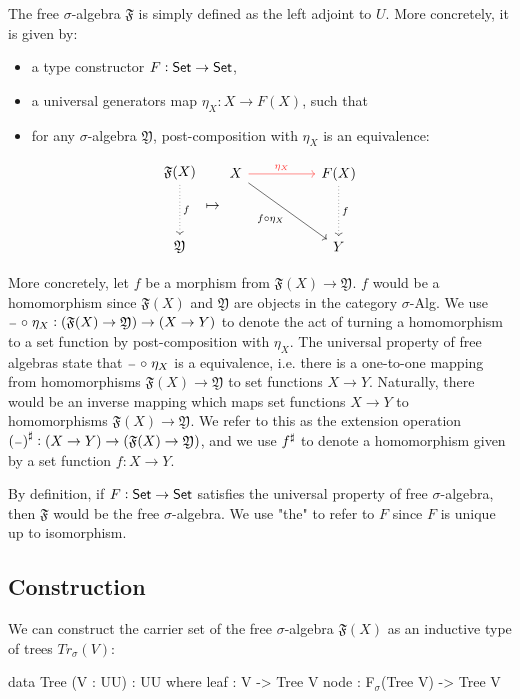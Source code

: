 The free $\sigma$-algebra $\mathfrak{F}$ is simply defined as the left adjoint to $U$.
More concretely, it is given by:
\begin{itemize}
    \item a type constructor $F : \mathsf{Set} \to \mathsf{Set}$,
    \item a universal generators map $\eta_X : X \to F(X)$, such that
    \item for any $\sigma$-algebra $\mathfrak{Y}$, post-composition with $\eta_X$ is an equivalence:
\end{itemize}
\[
\begin{tikzcd}[ampersand replacement=\&]
	\mathfrak{F}(X) \\
	\\
	\mathfrak{Y}
	\arrow["f", dotted, from=1-1, to=3-1]
\end{tikzcd}
\mapsto
\begin{tikzcd}[ampersand replacement=\&]
	X \&\& {F(X)} \\
	\\
	\&\& {Y}
	\arrow["\eta_X", color={rgb,255:red,255;green,54;blue,51}, from=1-1, to=1-3]
	\arrow["f \comp \eta_X"', from=1-1, to=3-3]
	\arrow["{f}", dotted, from=1-3, to=3-3]
\end{tikzcd}\]

More concretely, let $f$ be a morphism from $\mathfrak{F}(X) \to \mathfrak{Y}$.
$f$ would be a homomorphism since $\mathfrak{F}(X)$ and $\mathfrak{Y}$ are
objects in the category $\sigma$-Alg. 
We use
${\scriptstyle{-}} \mathrel{\circ} \eta_X : (\mathfrak{F}(X) \to \mathfrak{Y}) \to (X \to Y)$
to denote the act of turning a homomorphism to a set function by
post-composition with $\eta_X$.
The universal property of free algebras state that ${\scriptstyle{-}} \mathrel{\circ} \eta_X$
is a equivalence, i.e. there is a one-to-one mapping from
homomorphisms $\mathfrak{F}(X) \to \mathfrak{Y}$ to set functions $X \to Y$.
Naturally, there would be an inverse mapping which maps set functions $X \to Y$
to homomorphisms $\mathfrak{F}(X) \to \mathfrak{Y}$. We refer to this
as the extension operation ${({\scriptstyle{-}})}^{\sharp} : (X \to Y) \to (\mathfrak{F}(X) \to \mathfrak{Y})$,
and we use ${f}^{\sharp}$ to denote a homomorphism given by a set function $f : X \to Y$.

By definition, if $F : \mathsf{Set} \to \mathsf{Set}$ satisfies the universal property of
free $\sigma$-algebra, then $\mathfrak{F}$ would be the free $\sigma$-algebra.
We use "the" to refer to $F$ since $F$ is unique up to isomorphism. 

\subsection{Construction}
We can construct the carrier set of the free $\sigma$-algebra
$\mathfrak{F}(X)$ as an inductive type of trees $Tr_\sigma(V)$:
\begin{code}
data Tree (V : UU) : UU where
    leaf : V -> Tree V
    node : F$_\sigma$(Tree V) -> Tree V
\end{code}

